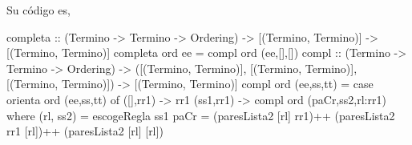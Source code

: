 \begin{itemize}
Su código es,

\begin{codigo}
completa :: (Termino -> Termino -> Ordering)
            -> [(Termino, Termino)] -> [(Termino, Termino)]
completa ord ee = compl ord (ee,[],[])
compl :: (Termino -> Termino -> Ordering)
         -> ([(Termino, Termino)], [(Termino, Termino)],
             [(Termino, Termino)])
         -> [(Termino, Termino)]
compl ord (ee,ss,tt) = case orienta ord (ee,ss,tt) of
                         ([],rr1)  -> rr1
                         (ss1,rr1) -> compl ord
                                      (paCr,ss2,rl:rr1)
      where (rl, ss2) = escogeRegla ss1
            paCr = (paresLista2 [rl] rr1)++
                   (paresLista2 rr1 [rl])++
                   (paresLista2 [rl] [rl])
\end{codigo}

\end{itemize}

           


